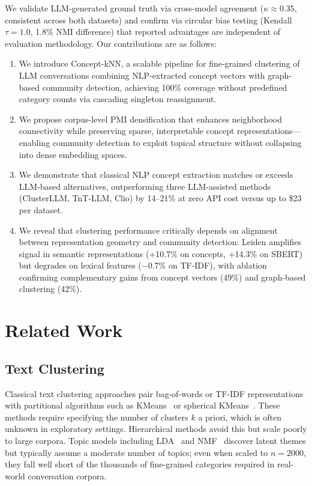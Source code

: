 \documentclass[conference]{IEEEtran}
\begin{document}
We validate LLM-generated ground truth via cross-model agreement ($\kappa \approx 0.35$, consistent across both datasets) and confirm via circular bias testing (Kendall $\tau = 1.0$, 1.8\% NMI difference) that reported advantages are independent of evaluation methodology. Our contributions are as follows:
\begin{enumerate}
    \item We introduce Concept-kNN, a scalable pipeline for fine-grained clustering of LLM conversations combining NLP-extracted concept vectors with graph-based community detection, achieving 100\% coverage without predefined category counts via cascading singleton reassignment.
    \item We propose corpus-level PMI densification that enhances neighborhood connectivity while preserving sparse, interpretable concept representations---enabling community detection to exploit topical structure without collapsing into dense embedding spaces.
    \item We demonstrate that classical NLP concept extraction matches or exceeds LLM-based alternatives, outperforming three LLM-assisted methods (ClusterLLM, TnT-LLM, Clio) by 14--21\% at zero API cost versus up to \$23 per dataset.
    \item We reveal that clustering performance critically depends on alignment between representation geometry and community detection: Leiden amplifies signal in semantic representations (+10.7\% on concepts, +14.3\% on SBERT) but degrades on lexical features ($-$0.7\% on TF-IDF), with ablation confirming complementary gains from concept vectors (49\%) and graph-based clustering (42\%).
\end{enumerate}

\section{Related Work}

\subsection{Text Clustering}

Classical text clustering approaches pair bag-of-words or TF-IDF representations with partitional algorithms such as KMeans~\cite{macqueen1967kmeans} or spherical KMeans~\cite{dhillon2001spherical}. These methods require specifying the number of clusters $k$ a priori, which is often unknown in exploratory settings. Hierarchical methods avoid this but scale poorly to large corpora. Topic models including LDA~\cite{blei2003lda} and NMF~\cite{lee1999nmf} discover latent themes but typically assume a moderate number of topics; even when scaled to $n\!=\!2000$, they fall well short of the thousands of fine-grained categories required in real-world conversation corpora.
\end{document}
